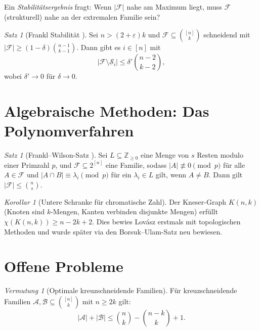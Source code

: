 \documentclass[12pt,a4paper]{amsart}
\theoremstyle{definition}
\theoremstyle{remark}
\newtheorem{satz}[theorem]{Satz}
\newtheorem{vermutung}[theorem]{Vermutung}
\newtheorem{korollar}[theorem]{Korollar}
\newcommand{\Z}{\mathbb{Z}}
\begin{document}
Ein \emph{Stabilitätsergebnis} fragt: Wenn $|\mathcal{F}|$ nahe am Maximum liegt,
muss $\mathcal{F}$ (strukturell) nahe an der extremalen Familie sein?

\begin{satz}[Frankl Stabilität \cite{Frankl1987stability}]\label{satz:frankl_stab}
Sei $n > (2+\varepsilon)k$ und $\mathcal{F} \subseteq \binom{[n]}{k}$ schneidend mit
$|\mathcal{F}| \geq (1-\delta)\binom{n-1}{k-1}$. Dann gibt es $i \in [n]$ mit
\[
  |\mathcal{F} \setminus \mathcal{S}_i| \leq \delta' \binom{n-2}{k-2},
\]
wobei $\delta' \to 0$ für $\delta \to 0$.
\end{satz}

\section{Algebraische Methoden: Das Polynomverfahren}\label{sec:algebraisch}

\begin{satz}[Frankl--Wilson-Satz \cite{FranklWilson1981}]\label{satz:frankl_wilson}
Sei $L \subseteq \Z_{\geq 0}$ eine Menge von $s$ Resten modulo einer Primzahl $p$,
und $\mathcal{F} \subseteq 2^{[n]}$ eine Familie, sodass $|A| \not\equiv 0 \pmod{p}$
für alle $A \in \mathcal{F}$ und $|A \cap B| \equiv \lambda_i \pmod{p}$ für ein
$\lambda_i \in L$ gilt, wenn $A \neq B$. Dann gilt $|\mathcal{F}| \leq \binom{n}{s}$.
\end{satz}

\begin{korollar}[Untere Schranke für chromatische Zahl]\label{kor:chrom}
Der Kneser-Graph $K(n, k)$ (Knoten sind $k$-Mengen, Kanten verbinden disjunkte
Mengen) erfüllt $\chi(K(n, k)) \geq n - 2k + 2$. Dies bewies Lovász erstmals mit
topologischen Methoden \cite{Lovasz1978} und wurde später via den Borsuk--Ulam-Satz
neu bewiesen.
\end{korollar}

\section{Offene Probleme}\label{sec:offen}

\begin{vermutung}[Optimale kreuzschneidende Familien]\label{verm:kreuz_opt}
Für kreuzschneidende Familien $\mathcal{A}, \mathcal{B} \subseteq \binom{[n]}{k}$
mit $n \geq 2k$ gilt:
\[
  |\mathcal{A}| + |\mathcal{B}| \leq \binom{n}{k} - \binom{n-k}{k} + 1.
\]
\end{vermutung}
\end{document}
